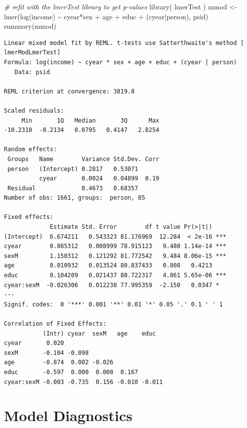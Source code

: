 \documentclass[
  letterpaper,
  DIV=11,
  numbers=noendperiod]{scrreprt}
\newenvironment{Shaded}{\begin{snugshade}}{\end{snugshade}}
\newcommand{\CommentTok}[1]{\textcolor[rgb]{0.38,0.63,0.69}{\textit{#1}}}
\newcommand{\FunctionTok}[1]{\textcolor[rgb]{0.02,0.16,0.49}{#1}}
\newcommand{\NormalTok}[1]{\textcolor[rgb]{0.00,0.44,0.13}{#1}}
\newcommand{\OtherTok}[1]{\textcolor[rgb]{0.00,0.44,0.13}{#1}}
\newcommand{\SpecialCharTok}[1]{\textcolor[rgb]{0.25,0.44,0.63}{#1}}
\begin{document}
\begin{Shaded}
\begin{Highlighting}[]
\CommentTok{\# refit with the lmerTest library to get p{-}values}
\FunctionTok{library}\NormalTok{( lmerTest )}
\NormalTok{mmod }\OtherTok{\textless{}{-}} \FunctionTok{lmer}\NormalTok{(}\FunctionTok{log}\NormalTok{(income) }\SpecialCharTok{\textasciitilde{}}\NormalTok{ cyear}\SpecialCharTok{*}\NormalTok{sex }\SpecialCharTok{+}\NormalTok{ age }\SpecialCharTok{+}\NormalTok{ educ }\SpecialCharTok{+}\NormalTok{ (cyear}\SpecialCharTok{|}\NormalTok{person), psid)}
\FunctionTok{summary}\NormalTok{(mmod)}
\end{Highlighting}
\end{Shaded}

\begin{verbatim}
Linear mixed model fit by REML. t-tests use Satterthwaite's method [
lmerModLmerTest]
Formula: log(income) ~ cyear * sex + age + educ + (cyear | person)
   Data: psid

REML criterion at convergence: 3819.8

Scaled residuals: 
     Min       1Q   Median       3Q      Max 
-10.2310  -0.2134   0.0795   0.4147   2.8254 

Random effects:
 Groups   Name        Variance Std.Dev. Corr
 person   (Intercept) 0.2817   0.53071      
          cyear       0.0024   0.04899  0.19
 Residual             0.4673   0.68357      
Number of obs: 1661, groups:  person, 85

Fixed effects:
             Estimate Std. Error        df t value Pr(>|t|)    
(Intercept)  6.674211   0.543323 81.176969  12.284  < 2e-16 ***
cyear        0.085312   0.008999 78.915123   9.480 1.14e-14 ***
sexM         1.150312   0.121292 81.772542   9.484 8.06e-15 ***
age          0.010932   0.013524 80.837433   0.808   0.4213    
educ         0.104209   0.021437 80.722317   4.861 5.65e-06 ***
cyear:sexM  -0.026306   0.012238 77.995359  -2.150   0.0347 *  
---
Signif. codes:  0 '***' 0.001 '**' 0.01 '*' 0.05 '.' 0.1 ' ' 1

Correlation of Fixed Effects:
           (Intr) cyear  sexM   age    educ  
cyear       0.020                            
sexM       -0.104 -0.098                     
age        -0.874  0.002 -0.026              
educ       -0.597  0.000  0.008  0.167       
cyear:sexM -0.003 -0.735  0.156 -0.010 -0.011
\end{verbatim}

\hypertarget{model-diagnostics}{%
\section{Model Diagnostics}\label{model-diagnostics}}
\end{document}
